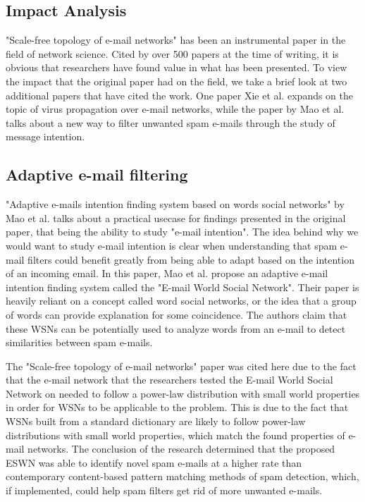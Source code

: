 \documentclass[11pt]{article}
\begin{document}
\begin{multicols}{2}
\section{Impact Analysis}
\hspace*{\parindent}"Scale-free topology of e-mail networks" has been an instrumental paper in the field of network science. Cited by over 500 papers at the time of writing, it is obvious that researchers have found value in what has been presented. To view the impact that the original paper had on the field, we take a brief look at two additional papers that have cited the work. One paper Xie et al. \cite{5} expands on the topic of virus propagation over e-mail networks, while the paper by Mao et al. \cite{4} talks about a new way to filter unwanted spam e-mails through the study of message intention.

\subsection{Adaptive e-mail filtering}
\hspace*{\parindent}"Adaptive e-mails intention finding system based on words social networks" by Mao et al. \cite{4} talks about a practical usecase for findings presented in the original paper, that being the ability to study "e-mail intention". The idea behind why we would want to study e-mail intention is clear when understanding that spam e-mail filters could benefit greatly from being able to adapt based on the intention of an incoming email. In this paper, Mao et al. propose an adaptive e-mail intention finding system called the "E-mail World Social Network". Their paper is heavily reliant on a concept called word social networks, or the idea that a group of words can provide explanation for some coincidence. The authors claim that these WSNs can be potentially used to analyze words from an e-mail to detect similarities between spam e-mails. 

The "Scale-free topology of e-mail networks" paper was cited here due to the fact that the e-mail network that the researchers tested the E-mail World Social Network on needed to follow a power-law distribution with small world properties in order for WSNs to be applicable to the problem. This is due to the fact that WSNs built from a standard dictionary are likely to follow power-law distributions with small world properties, which match the found properties of e-mail networks. The conclusion of the research determined that the proposed ESWN was able to identify novel spam e-mails at a higher rate than contemporary content-based pattern matching methods of spam detection, which, if implemented, could help spam filters get rid of more unwanted e-mails.


\end{multicols}
\end{document}
